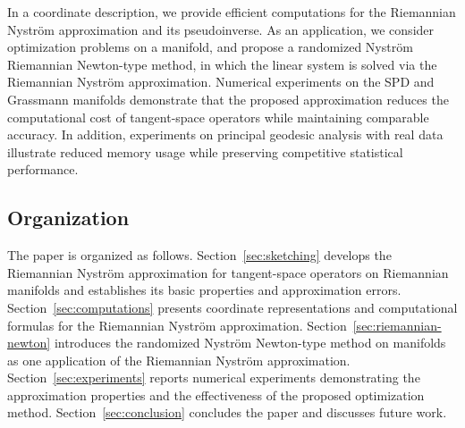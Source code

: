 \documentclass[final,onefignum,onetabnum]{siamart250211}
\begin{document}
In a coordinate description, we provide efficient computations for the Riemannian Nystr\"om approximation and its pseudoinverse. As an application, we consider optimization problems on a manifold, and propose a randomized Nystr\"om Riemannian Newton-type method, in which the linear system is solved via the Riemannian Nystr\"om approximation.
Numerical experiments on the SPD and Grassmann manifolds demonstrate that the proposed approximation reduces the computational cost of tangent-space operators while maintaining comparable accuracy. In addition, experiments on principal geodesic analysis with real data illustrate reduced memory usage while preserving competitive statistical performance.

\subsection{Organization}
The paper is organized as follows.
Section~\ref{sec:sketching} develops the Riemannian Nystr\"om approximation for tangent-space operators on Riemannian manifolds and establishes its basic properties and approximation errors.
Section~\ref{sec:computations} presents coordinate representations and computational formulas for the Riemannian Nystr\"om approximation.
Section~\ref{sec:riemannian-newton} introduces the randomized Nystr\"om Newton-type method on manifolds as one application of the Riemannian Nystr\"om approximation.
Section~\ref{sec:experiments} reports numerical experiments demonstrating the approximation properties and the effectiveness of the proposed optimization method.
Section~\ref{sec:conclusion} concludes the paper and discusses future work.
\end{document}
